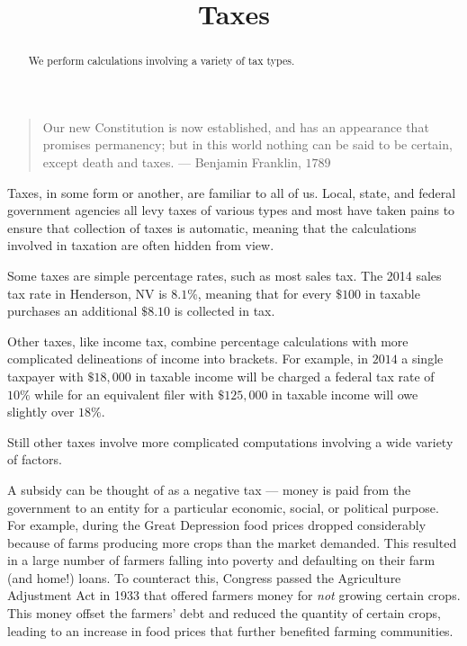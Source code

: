\documentclass{ximera}
\title{Taxes}
\begin{document}
\begin{abstract}
We perform calculations involving a variety of tax types.
\end{abstract}
\maketitle
\begin{quote}
Our new Constitution is now established, and has an appearance that promises permanency; but in this world nothing can be said to be certain, except death and taxes. --- Benjamin Franklin, $1789$
\end{quote}

Taxes, in some form or another, are familiar to all of us. Local, state, and federal government agencies all levy taxes of various types and most have taken pains to ensure that collection of taxes is automatic, meaning that the calculations involved in taxation are often hidden from view.

Some taxes are simple percentage rates, such as most sales tax. The 2014 sales tax rate in Henderson, NV is $8.1\%$, meaning that for every $\$100$ in taxable purchases an additional $\$8.10$ is collected in tax.

Other taxes, like income tax, combine percentage calculations with more complicated delineations of income into brackets. For example, in $2014$ a single taxpayer with $\$18,000$ in taxable income will be charged a federal tax rate of $10\%$ while for an equivalent filer with $\$125,000$ in taxable income will owe slightly over $18\%$.

Still other taxes involve more complicated computations involving a wide variety of factors. 

A subsidy can be thought of as a negative tax --- money is paid from the government to an entity for a particular economic, social, or political purpose. For example, during the Great Depression food prices dropped considerably because of farms producing more crops than the market demanded. This resulted in a large number of farmers falling into poverty and defaulting on their farm (and home!) loans. To counteract this, Congress passed the Agriculture Adjustment Act in 1933 that offered farmers money for \emph{not} growing certain crops. This money offset the farmers' debt and reduced the quantity of certain crops, leading to an increase in food prices that further benefited farming communities.
\end{document}

